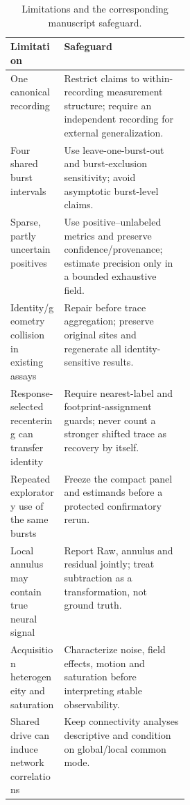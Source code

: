 \begin{table}[!htbp]
\centering
\caption{Limitations and the corresponding manuscript safeguard.}
\label{tab:limitations}
\small
\begin{tabularx}{\linewidth}{>{\raggedright\arraybackslash}p{0.30\linewidth} X}
\toprule
Limitation & Safeguard \\
\midrule
One canonical recording & Restrict claims to within-recording measurement structure; require an independent recording for external generalization. \\
Four shared burst intervals & Use leave-one-burst-out and burst-exclusion sensitivity; avoid asymptotic burst-level claims. \\
Sparse, partly uncertain positives & Use positive--unlabeled metrics and preserve confidence/provenance; estimate precision only in a bounded exhaustive field. \\
Identity/geometry collision in existing assays & Repair before trace aggregation; preserve original sites and regenerate all identity-sensitive results. \\
Response-selected recentering can transfer identity & Require nearest-label and footprint-assignment guards; never count a stronger shifted trace as recovery by itself. \\
Repeated exploratory use of the same bursts & Freeze the compact panel and estimands before a protected confirmatory rerun. \\
Local annulus may contain true neural signal & Report Raw, annulus and residual jointly; treat subtraction as a transformation, not ground truth. \\
Acquisition heterogeneity and saturation & Characterize noise, field effects, motion and saturation before interpreting stable observability. \\
Shared drive can induce network correlations & Keep connectivity analyses descriptive and condition on global/local common mode. \\
\bottomrule
\end{tabularx}
\end{table}
